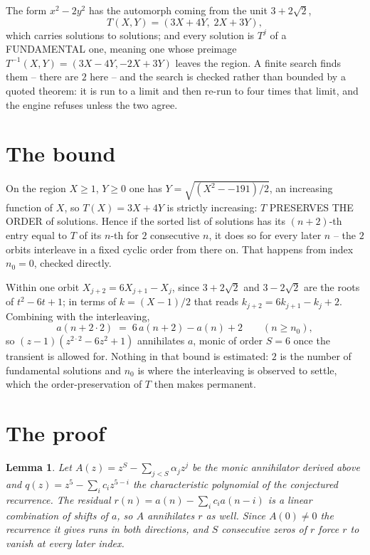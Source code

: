 \documentclass[11pt,a4paper]{article}
\theoremstyle{plain}
\newtheorem{lemma}[theorem]{Lemma}
\theoremstyle{definition}
\begin{document}
The form $x^2-2y^2$ has the automorph coming from the unit $3+2\sqrt2$,
\[
T(X,Y)=(3X+4Y,\;2X+3Y),
\]
which carries solutions to solutions; and every solution is $T^{j}$ of a FUNDAMENTAL one,
meaning one whose preimage $T^{-1}(X,Y)=(3X-4Y,-2X+3Y)$ leaves the region. A finite search
finds them -- there are $2$ here -- and the search is checked rather than bounded by a quoted
theorem: it is run to a limit and then re-run to four times that limit, and the engine refuses
unless the two agree.

\section{The bound}

On the region $X\ge1$, $Y\ge0$ one has $Y=\sqrt{(X^2--191)/2}$, an increasing function of $X$,
so $T(X)=3X+4Y$ is strictly increasing: $T$ PRESERVES THE ORDER of solutions. Hence if the
sorted list of solutions has its $(n+2)$-th entry equal to $T$ of its $n$-th for $2$
consecutive $n$, it does so for every later $n$ -- the $2$ orbits interleave in a fixed cyclic
order from there on. That happens from index $n_0=0$, checked directly.

Within one orbit $X_{j+2}=6X_{j+1}-X_j$, since $3+2\sqrt2$ and $3-2\sqrt2$ are the roots of
$t^2-6t+1$; in terms of $k=(X-1)/2$ that reads $k_{j+2}=6k_{j+1}-k_j+2$. Combining with the
interleaving,
\[
a(n+2\cdot2)\;=\;6\,a(n+2)-a(n)+2 \qquad (n\ge n_0),
\]
so $(z-1)(z^{2\cdot2}-6z^{2}+1)$ annihilates $a$, monic of order $S=6$ once the
transient is allowed for. Nothing in that bound is estimated: $2$ is the number of fundamental
solutions and $n_0$ is where the interleaving is observed to settle, which the order-preservation
of $T$ then makes permanent.

\section{The proof}

\begin{lemma}\label{lem:crit}
Let $A(z)=z^S-\sum_{j<S}\alpha_jz^{j}$ be the monic annihilator derived above and
$q(z)=z^{5}-\sum_ic_iz^{5-i}$ the characteristic polynomial of the conjectured
recurrence. The residual $r(n)=a(n)-\sum_ic_ia(n-i)$ is a linear combination of shifts of $a$,
so $A$ annihilates $r$ as well. Since $A(0)\ne0$ the recurrence it gives runs in both
directions, and $S$ consecutive zeros of $r$ force $r$ to vanish at every later index.
\end{lemma}
\end{document}
